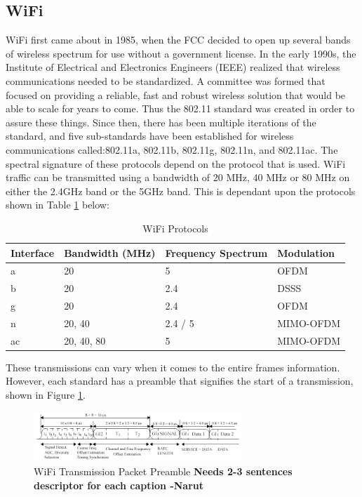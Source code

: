 \subsection{WiFi}
WiFi first came about in 1985, when the FCC decided to open up several bands of wireless spectrum for use without a government license. In the early 1990s, the Institute of Electrical and Electronics Engineers (IEEE) realized that wireless communications needed to be standardized. A committee was formed that focused on providing a reliable, fast and robust wireless solution that would be able to scale for years to come. Thus the 802.11 standard was created in order to assure these things. Since then, there has been multiple iterations of the standard, and five sub-standards have been established for wireless communications called:802.11a, 802.11b, 802.11g, 802.11n, and 802.11ac. The spectral signature of these protocols depend on the protocol that is used. WiFi traffic can be transmitted using a bandwidth of 20 MHz, 40 MHz or 80 MHz on either the 2.4GHz band or the 5GHz band. This is dependant upon the protocols shown in Table \ref{table:wifi_protocols} below:
\begin{table}[ht]
\centering
\caption{WiFi Protocols}
\label{table:wifi_protocols}
\begin{tabular}{|l|l|l|l|}
	\hline Interface & Bandwidth (MHz) & Frequency Spectrum & Modulation \\ \hline
     		       a &              20 &                  5 &       OFDM \\
     		       b &              20 &                2.4 &       DSSS \\
     		       g &              20 &                2.4 &       OFDM \\
     		       n &          20, 40 &            2.4 / 5 &  MIMO-OFDM \\
     		      ac &      20, 40, 80 &                  5 &  MIMO-OFDM \\ \hline
\end{tabular}
\end{table}\par
These transmissions can vary when it comes to the entire frames information. However, each standard has a preamble that signifies the start of a transmission, shown in Figure \ref{fig:wifi_preamble}.
\begin{figure}[ht]
\centering
\includegraphics[width=0.70\textwidth]{img/ofdm_preamble.jpg}
\caption{WiFi Transmission Packet Preamble \textbf{Needs 2-3 sentences descriptor for each caption -Narut}}
\label{fig:wifi_preamble}
\end{figure}\par
